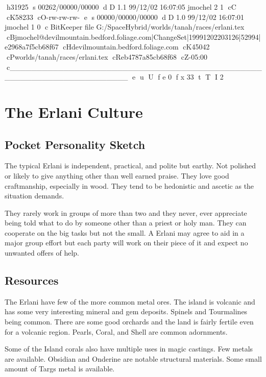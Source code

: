 h31925
s 00262/00000/00000
d D 1.1 99/12/02 16:07:05 jmochel 2 1
cC
cK58233
cO-rw-rw-rw-
e
s 00000/00000/00000
d D 1.0 99/12/02 16:07:01 jmochel 1 0
c BitKeeper file G:/SpaceHybrid/worlds/tanah/races/erlani.tex
cBjmochel@devilmountain.bedford.foliage.com|ChangeSet|19991202203126|52994|e2968a7f5cb68f67
cHdevilmountain.bedford.foliage.com
cK45042
cPworlds/tanah/races/erlani.tex
cReb4787a85cb68f68
cZ-05:00
c______________________________________________________________________
e
u
U
f e 0
f x 33
t
T
I 2
\chapter{The Erlani Culture}

\section{Pocket Personality Sketch}

The typical Erlani is independent, practical, and 
polite but earthy. Not polished or likely to give anything other 
than well earned praise. They love good craftmanship, especially in wood.
They tend to be hedonistic and ascetic as the situation demands.

They rarely work in groups of more than two and they never, ever 
appreciate being told what to do by someone other than a priest or holy man.
They can cooperate on the big tasks but not the small. A Erlani
may agree to aid in a major group effort but each party will work on 
their piece of it and expect no unwanted offers of help.

\section{Resources}

The Erlani have few of the more common metal ores.
The island is volcanic and has some very
interesting mineral and gem deposits. Spinels and Tourmalines being
common. There are some good orchards and the land is fairly
fertile even for a volcanic region. Pearls, Coral, and Shell are common
adornments.

Some of the Island corals also have multiple uses in magic castings.
Few metals are available. Obsidian and Onderine are notable structural
materials. Some small amount of Targs metal is available.


